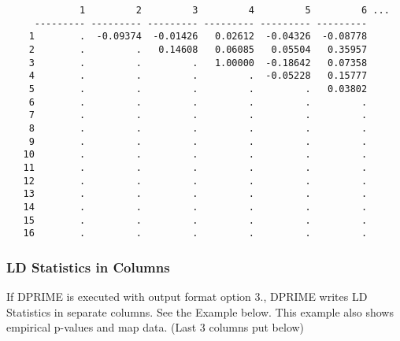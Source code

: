 \begin{verbatim}
             1         2         3         4         5         6 ...
     --------- --------- --------- --------- --------- --------- 
    1        .  -0.09374  -0.01426   0.02612  -0.04326  -0.08778 
    2        .         .   0.14608   0.06085   0.05504   0.35957 
    3        .         .         .   1.00000  -0.18642   0.07358 
    4        .         .         .         .  -0.05228   0.15777 
    5        .         .         .         .         .   0.03802 
    6        .         .         .         .         .         . 
    7        .         .         .         .         .         . 
    8        .         .         .         .         .         . 
    9        .         .         .         .         .         . 
   10        .         .         .         .         .         . 
   11        .         .         .         .         .         . 
   12        .         .         .         .         .         . 
   13        .         .         .         .         .         . 
   14        .         .         .         .         .         . 
   15        .         .         .         .         .         . 
   16        .         .         .         .         .         . 
\end{verbatim}

\subsubsection{LD Statistics in Columns}

If DPRIME is executed with output format option 3., DPRIME writes LD Statistics
in separate columns.  See the Example below.  This example also shows empirical
p-values and map data. (Last 3 columns put below)

